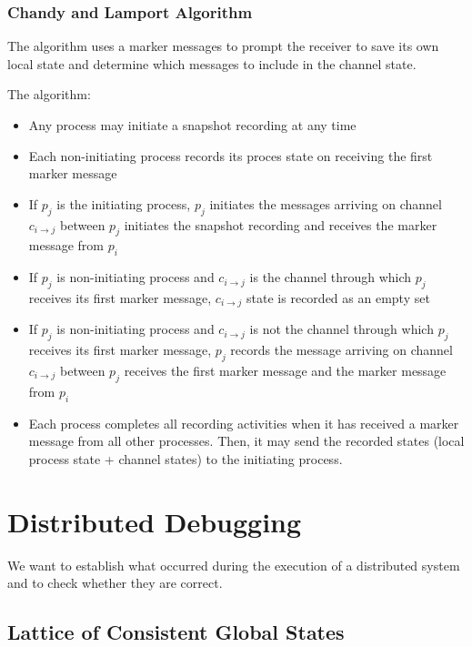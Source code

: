 \begin{multicols*}{2}
\subsubsection{Chandy and Lamport Algorithm}

\noindent The algorithm uses a marker messages to prompt the receiver to save its own local state and determine which messages to include in the channel state.

\noindent The algorithm:

\begin{itemize}
  \item Any process may initiate a snapshot recording at any time
  \item Each non-initiating process records its proces state on receiving the first marker message
  \item If $p_j$ is the initiating process, $p_j$ initiates the messages arriving on channel $c_{i\rightarrow j}$ between $p_j$ initiates the snapshot recording and receives the marker message from $p_i$
  \item If $p_j$ is non-initiating process and $c_{i\rightarrow j}$ is the channel through which $p_j$ receives its first marker message, $c_{i\rightarrow j}$ state is recorded as an empty set
  \item If $p_j$ is non-initiating process and $c_{i\rightarrow j}$ is not the channel through which $p_j$ receives its first marker message, $p_j$ records the message arriving on channel $c_{i\rightarrow j}$ between $p_j$ receives the first marker message and the marker message from $p_i$
  \item Each process completes all recording activities when it has received a marker message from all other processes. Then, it may send the recorded states (local process state + channel states) to the initiating process.
\end{itemize}

\section{Distributed Debugging}

\noindent We want to establish what occurred during the execution of a distributed system and to check whether they are correct. 

\subsection{Lattice of Consistent Global States}


\end{multicols*}
